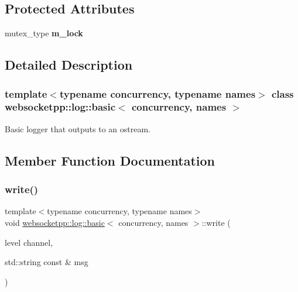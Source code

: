 \subsection*{Protected Attributes}
\begin{DoxyCompactItemize}
\item 
\mbox{\label{classwebsocketpp_1_1log_1_1basic_ad837b993a6e1070fbd3c1dc59b15a0eb}} 
mutex\+\_\+type {\bfseries m\+\_\+lock}
\end{DoxyCompactItemize}


\subsection{Detailed Description}
\subsubsection*{template$<$typename concurrency, typename names$>$\newline
class websocketpp\+::log\+::basic$<$ concurrency, names $>$}

Basic logger that outputs to an ostream. 

\subsection{Member Function Documentation}
\mbox{\label{classwebsocketpp_1_1log_1_1basic_a9f87a8c3e5d8e25e5f014756827a587a}} 
\subsubsection{\texorpdfstring{write()}{write()}\hspace{0.1cm}{\footnotesize\ttfamily [1/2]}}
{\footnotesize\ttfamily template$<$typename concurrency, typename names$>$ \\
void \mbox{\hyperlink{classwebsocketpp_1_1log_1_1basic}{websocketpp\+::log\+::basic}}$<$ concurrency, names $>$\+::write (\begin{DoxyParamCaption}\item[{level}]{channel,  }\item[{std\+::string const \&}]{msg }\end{DoxyParamCaption})\hspace{0.3cm}{\ttfamily [inline]}}



